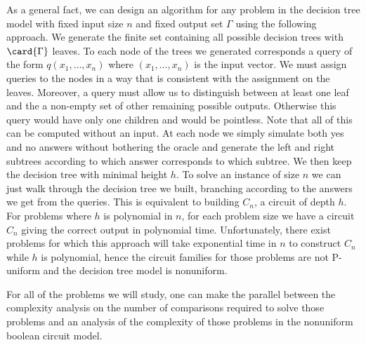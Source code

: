 As a general fact, we can design an algorithm for any problem in the decision
tree model with fixed input size \(n\) and fixed output set \(\Gamma\) using
the following approach. We generate the finite set containing all possible
decision trees with \(\card{\Gamma}\) leaves. To each node of the trees we
generated corresponds a query of the form \(q(x_1,\ldots,x_n)\) where
\((x_1,\ldots,x_n)\) is the input vector. We must assign queries to the nodes
in a way that is consistent with the assignment on the leaves. Moreover, a query
must allow us to distinguish between at least one leaf and the a non-empty set
of other remaining possible outputs. Otherwise this query would have
only one children and would be pointless. Note that all of this can
be computed without an input. At each node we simply simulate both yes and no
answers without bothering the oracle and generate the left and right subtrees
according to which answer corresponds to which subtree. We then keep the
decision tree with minimal height \(h\). To solve an instance of size \(n\) we
can just walk through the decision tree we built, branching according to the
answers we get from the queries. This is equivalent to building \(C_n\), a circuit
of depth \(h\). For problems where \(h\) is polynomial in \(n\), for each
problem size we have a circuit \(C_n\) giving the correct output in polynomial
time. Unfortunately, there exist problems for which this approach will take
exponential time in \(n\) to construct \(C_n\) while \(h\) is polynomial, hence
the circuit families for those problems are not P-uniform and the decision tree
model is nonuniform.

For all of the problems we will study, one can make the parallel between the
complexity analysis on the number of comparisons required to solve those
problems and an analysis of the complexity of those problems in the nonuniform
boolean circuit model.
